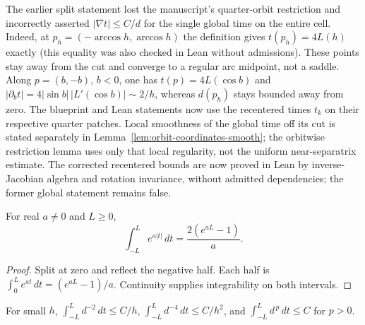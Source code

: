 \begin{remark}
The earlier split statement lost the manuscript's quarter-orbit restriction and
incorrectly asserted $|\nabla t|\le C/d$ for the single global time on the entire cell.
Indeed, at $p_h=(-\arccos h,\arccos h)$ the definition gives $t(p_h)=4L(h)$ exactly
(this equality was also checked in Lean without admissions). These points stay away
from the cut and converge to a regular arc midpoint, not a saddle.
Along $p=(b,-b)$, $b<0$, one has $t(p)=4L(\cos b)$ and
$|\partial_b t|=4|\sin b|\,|L'(\cos b)|\sim2/h$, whereas $d(p_h)$ stays bounded away from zero.
The blueprint and Lean statements now use the recentered times $t_k$ on their respective
quarter patches. Local smoothness of the global time off its cut is stated separately
in Lemma~\ref{lem:orbit-coordinates-smooth}; the orbitwise restriction lemma uses only that
local regularity, not the uniform near-separatrix estimate. The corrected
recentered bounds are now proved in Lean by inverse-Jacobian algebra and
rotation invariance, without admitted dependencies; the former global
statement remains false.
\end{remark}

\begin{lemma}
\label{lem:exponential-time-moment}
\leanok
For real $a\ne0$ and $L\ge0$,
\[
 \int_{-L}^L e^{a|t|}\,dt=\frac{2(e^{aL}-1)}a.
\]
\end{lemma}

\begin{proof}
\leanok
Split at zero and reflect the negative half. Each half is
$\int_0^L e^{at}\,dt=(e^{aL}-1)/a$.
Continuity supplies integrability on both intervals.
\end{proof}

\begin{lemma}
\label{lem:orbit-time-integrals}
\leanok
For small $h$, $\int_{-L}^{L}d^{-2}\,dt\le C/h$, $\int_{-L}^{L}d^{-4}\,dt\le C/h^2$, and
$\int_{-L}^{L}d^{\,p}\,dt\le C$ for $p>0$.
\end{lemma}

